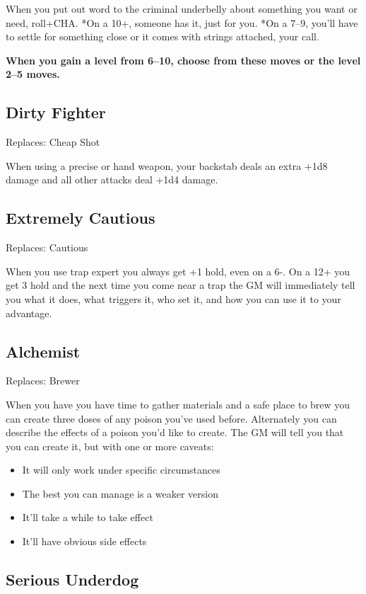 When you put out word to the criminal underbelly about something you want or need, roll+CHA. *On a 10+, someone has it, just for you. *On a 7--9, you'll have to settle for something close or it comes with strings attached, your call.

\vspace{\baselineskip}
{\bfseries When you gain a level from 6--10, choose from these moves or the level 2--5 moves.}
\subsection{Dirty Fighter}

Replaces: Cheap Shot

When using a precise or hand weapon, your backstab deals an extra +1d8 damage and all other attacks deal +1d4 damage.
\subsection{Extremely Cautious}

Replaces: Cautious

When you use trap expert you always get +1 hold, even on a 6-. On a 12+ you get 3 hold and the next time you come near a trap the GM will immediately tell you what it does, what triggers it, who set it, and how you can use it to your advantage.
\subsection{Alchemist}

Replaces: Brewer

When you have you have time to gather materials and a safe place to brew you can create three doses of any poison you've used before. Alternately you can describe the effects of a poison you'd like to create. The GM will tell you that you can create it, but with one or more caveats:
\begin{itemize}
\item It will only work under specific circumstances
\item The best you can manage is a weaker version
\item It'll take a while to take effect
\item It'll have obvious side effects

\end{itemize}
\subsection{Serious Underdog}

